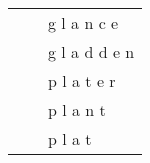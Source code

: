 \documentclass[11pt]{article}
\begin{document}
\begin{spacing}{1}
\begin{table}[!htpb]
\begin{tabular}{p{8cm} l p{5cm}}
                                                                                 &                 & g l a n c e                                                                                                                                                                                                                                                                                                                                                                                                     \\
                                                                                 &                 & g l a d d e n                                                                                                                                                                                                                                                                                                                                                                                                   \\
                                                                                 &                 & p l a t e r                                                                                                                                                                                                                                                                                                                                                                                                     \\
                                                                                 &                 & p l a n t                                                                                                                                                                                                                                                                                                                                                                                                       \\
                                                                                 &                 & p l a t                                                                                                                                                                                                                                                                                                                                                                                                         \\

\end{tabular}
\end{table}
\end{spacing}
\end{document}
